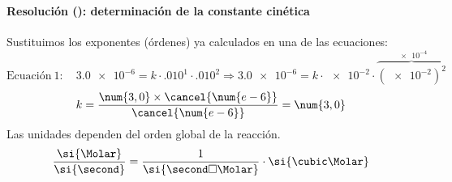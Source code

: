 \begin{frame}
	\frametitle{\ejerciciocmd}
	\framesubtitle{Resolución (): determinación de la constante cinética}
	Sustituimos los exponentes (órdenes) ya calculados en una de las ecuaciones:
	$$
		\text{Ecuación}~1:\quad\num{3,0e-6}=k\cdot\num{,010}^1\cdot\num{,010}^2\Rightarrow
		\num{3,0e-6}=k\cdot\num{e-2}\cdot\overbrace{(\num{e-2})^2}^{\num{e-4}}
	$$
	$$
		k=\frac{\num{3,0}\times\cancel{\num{e-6}}}{\cancel{\num{e-6}}}=\num{3,0}
	$$
	 Las unidades dependen del orden global de la reacción.
	$$
		\frac{\si{\Molar}}{\si{\second}}=\frac{1}{\si{\second\square\Molar}}\cdot\si{\cubic\Molar}
	$$
	\begin{center}
		\centering{}\\[.3cm]
		\centering{}\\[.3cm]
	\end{center}

\end{frame}
